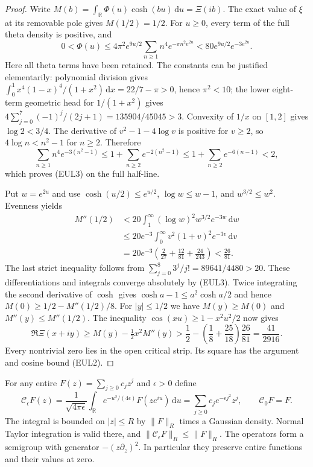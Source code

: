 \documentclass[11pt]{article}
\theoremstyle{remark}\newtheorem{remark}[theorem]{Remark}
\newcommand{\R}{\mathbb R}
\newcommand{\dd}{\,\mathrm d}
\begin{document}
\begin{proof}
Write $M(b)=\int_{\R}\Phi(u)\cosh(bu)\dd u=\Xi(ib)$.
The exact value of $\xi$ at its removable pole gives $M(1/2)=1/2$.
For $u\ge0$, every term of the full theta density is positive, and
\[
 0<\Phi(u)
 \le4\pi^2e^{9u/2}\sum_{n\ge1}n^4e^{-\pi n^2e^{2u}}
 <80e^{9u/2}e^{-3e^{2u}}.                               \tag{EUL3}
\]
Here all theta terms have been retained. The constants can be justified
elementarily: polynomial division gives
$\int_0^1x^4(1-x)^4/(1+x^2)\dd x=22/7-\pi>0$, hence
$\pi^2<10$; the lower eight-term geometric head for $1/(1+x^2)$
gives $4\sum_{j=0}^7(-1)^j/(2j+1)=135904/45045>3$.
Convexity of $1/x$ on $[1,2]$ gives $\log2<3/4$.
The derivative of $v^2-1-4\log v$ is positive for $v\ge2$,
so $4\log n<n^2-1$ for $n\ge2$. Therefore
\[
 \sum_{n\ge1}n^4e^{-3(n^2-1)}
 \le1+\sum_{n\ge2}e^{-2(n^2-1)}
 \le1+\sum_{n\ge2}e^{-6(n-1)}<2,
\]
which proves (EUL3) on the full half-line.

Put $w=e^{2u}$ and use $\cosh(u/2)\le e^{u/2}$,
$\log w\le w-1$, and $w^{3/2}\le w^2$. Evenness yields
\[
 \begin{split}
 M''(1/2)
 &<20\int_1^\infty(\log w)^2w^{3/2}e^{-3w}\dd w\\
 &\le20e^{-3}\int_0^\infty v^2(1+v)^2e^{-3v}\dd v\\
 &=20e^{-3}\left(\frac2{27}+\frac{12}{81}+\frac{24}{243}\right)
 <\frac{26}{81}.
 \end{split}                                             \tag{EUL4}
\]
The last strict inequality follows from
$\sum_{j=0}^8 3^j/j!=89641/4480>20$.
These differentiations and integrals converge absolutely by (EUL3).
Twice integrating the second derivative of $\cosh$ gives
$\cosh a-1\le a^2\cosh a/2$ and hence
$M(0)\ge1/2-M''(1/2)/8$.
For $|y|\le1/2$ we have $M(y)\ge M(0)$ and
$M''(y)\le M''(1/2)$.
The inequality $\cos(xu)\ge1-x^2u^2/2$ now gives
\[
 \Re\Xi(x+iy)\ge M(y)-\tfrac12x^2M''(y)
 >\frac12-\left(\frac18+\frac{25}{18}\right)\frac{26}{81}
 =\frac{41}{2916}.
\]
Every nontrivial zero lies in the open critical strip.
Its square has the argument and cosine bound (EUL2).
\end{proof}

For any entire $F(z)=\sum_{j\ge0}c_jz^j$ and $\epsilon>0$ define
\[
 \mathcal C_\epsilon F(z)=
 \frac1{\sqrt{4\pi\epsilon}}\int_{\R}
    e^{-u^2/(4\epsilon)}F(ze^{iu})\dd u
 =\sum_{j\ge0}c_je^{-\epsilon j^2}z^j,
 \qquad \mathcal C_0F=F.                                \tag{EUL5}
\]
The integral is bounded on $|z|\le R$ by $\|F\|_R$ times a
Gaussian density. Normal Taylor integration is valid there, and
$\|\mathcal C_\epsilon F\|_R\le\|F\|_R$.
The operators form a semigroup with generator
$-(z\partial_z)^2$. In particular they preserve entire functions
and their values at zero.
\end{document}
